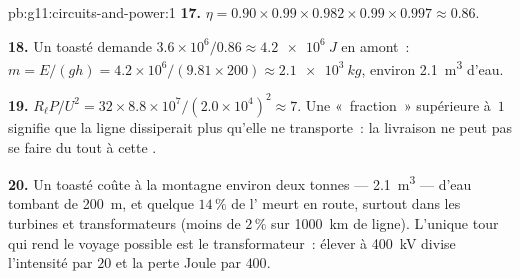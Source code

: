 \begin{solution}{pb:g11:circuits-and-power:1}
\textbf{17.} $\eta = 0.90 \times 0.99 \times 0.982 \times 0.99 \times
0.997 \approx 0.86$.

\textbf{18.} Un  toasté demande
$3.6\times10^{6}/0.86 \approx \qty{4.2e6}{J}$ en amont~:
$m = E/(gh) = 4.2\times10^{6}/(9.81 \times 200) \approx \qty{2.1e3}{kg}$,
environ \qty{2.1}{m^3} d'eau.

\textbf{19.} $R_\ell P/U^2 = 32 \times 8.8\times10^{7}/(2.0\times
10^{4})^2 \approx 7$. Une «~fraction~» supérieure à~$1$ signifie que la
ligne dissiperait plus qu'elle ne transporte~: la livraison ne peut
pas se faire du tout à cette
.

\textbf{20.} Un  toasté coûte à la
montagne environ deux tonnes --- \qty{2.1}{m^3} --- d'eau tombant de
\qty{200}{m}, et quelque $14\,\%$ de
l' meurt en route, surtout dans les
turbines et transformateurs (moins de $2\,\%$ sur \qty{1000}{km} de
ligne). L'unique tour qui rend le voyage possible est le transformateur~:
élever à \qty{400}{kV} divise l'intensité par $20$ et la perte Joule par
$400$.
\end{solution}
